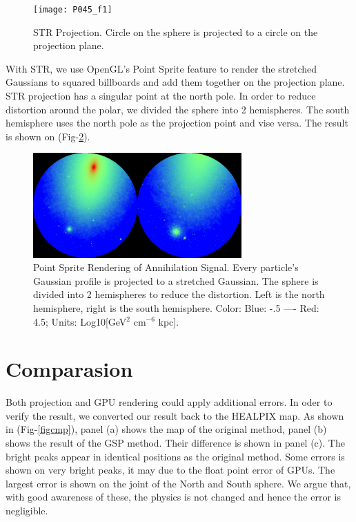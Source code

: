 \documentclass[11pt,twoside]{article}
\begin{document}
\begin{figure}[htb]
\begin{center}
 \texttt{[image: P045\_f1]}
\caption{STR Projection. Circle on the sphere is projected to a circle on the projection plane.\label{figstr}}
\end{center}
\end{figure}

With STR, we use OpenGL's Point Sprite feature to render the stretched Gaussians to squared billboards and add them together on the projection plane. STR projection has a singular point at the north pole. In order to reduce distortion around the polar, we divided the  sphere into 2 hemispheres. The south hemisphere uses the north pole as the projection point and vise versa. The result is shown on (Fig-\ref{figsky}).

\begin{figure}[htb]
\begin{center}
 \includegraphics[width=80mm]{P045_f2}
\caption{ Point Sprite Rendering of Annihilation Signal. Every particle's Gaussian profile is projected to a stretched Gaussian. The sphere is divided into 2 hemispheres to reduce the distortion. Left is the north hemisphere, right is the south hemisphere. Color: Blue: -.5 ---- Red: 4.5;  Units: Log10[GeV$^2$ cm$^{-6}$ kpc].\label{figsky}}
\end{center}
\end{figure}

\section{Comparasion}
Both projection and GPU rendering could apply additional errors. In oder to verify the result, we converted our result back to the HEALPIX map. As shown in (Fig-\ref{figcmp}), panel (a) shows the map of the original method, panel (b) shows the result of the GSP method. Their difference is shown in panel (c). The bright peaks appear in identical positions as the original method. Some errors is shown on very bright peaks, it may due to the float point error of GPUs. The largest error is shown on the joint of the North and South sphere. We argue that, with good awareness of these, the physics is not changed and hence the error is negligible. 
\end{document}
